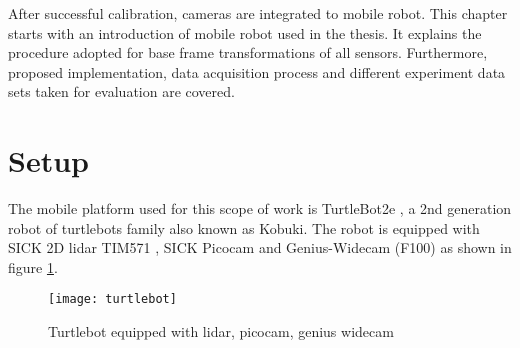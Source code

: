 After successful calibration, cameras are integrated to mobile robot. This chapter starts with an introduction of mobile robot used in the thesis. It explains the procedure adopted for base frame transformations of all sensors. Furthermore, proposed implementation, data acquisition process and different experiment data sets taken for evaluation are covered.

\section{Setup}
The mobile platform used for this scope of work is TurtleBot2e \cite{turtlebot2}, a 2nd generation robot of turtlebots family also known as Kobuki. The robot is equipped with SICK 2D \acrshort{lidar} TIM571 \cite{sick}, SICK Picocam and Genius-Widecam (F100) as shown in figure \ref{fig:turtlebot}.
\begin{figure}[h!]
	\centering
	\texttt{[image: turtlebot]}
	\caption{Turtlebot equipped with \acrshort{lidar}, picocam, genius widecam}
	\label{fig:turtlebot}
\end{figure}
